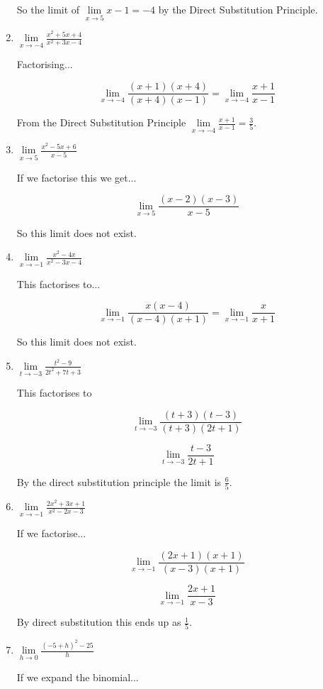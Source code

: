\documentclass{article}
\begin{document}
\begin{enumerate}
		So the limit of $\lim \limits _{x \to 5} x - 1 = -4$ by the Direct Substitution Principle.

		\item $\lim \limits _{x \to -4} \frac{x^2 + 5x + 4}{x^2 + 3x - 4}$

		Factorising...

		$$\lim \limits _{x \to -4} \frac{(x+1)(x+4)}{(x+4)(x-1)} = \lim \limits _{x \to -4} \frac{x+1}{x-1}$$

		From the Direct Substitution Principle $\lim \limits _{x \to -4} \frac{x+1}{x-1} = \frac{3}{5}$.

		\item $\lim \limits _{x \to 5} \frac{x^2 - 5x + 6}{x-5}$

		If we factorise this we get...

		$$\lim \limits _{x \to 5} \frac{(x-2)(x-3)}{x-5}$$

		So this limit does not exist.

		\item $\lim \limits _{x \to -1} \frac{x^2 - 4x}{x^2 - 3x - 4}$

		This factorises to...

		$$\lim \limits _{x \to -1} \frac{x(x - 4)}{(x-4)(x+1)} = \lim \limits _{x \to -1} \frac{x}{x+1}$$

		So this limit does not exist.

		\item $\lim \limits _{t \to -3} \frac{t^2 - 9}{2t^2 + 7t + 3}$

		This factorises to

		$$\lim \limits _{t \to -3} \frac{(t+3)(t-3)}{(t+3)(2t+1)}$$

		$$\lim \limits _{t \to -3} \frac{t-3}{2t+1}$$

		By the direct substitution principle the limit is $\frac{6}{5}$.

		\item $\lim \limits _{x \to -1} \frac{2x^2 + 3x + 1}{x^2 - 2x -3}$

		If we factorise...

		$$\lim \limits _{x \to -1} \frac{(2x+1)(x+1)}{(x-3)(x+1)}$$

		$$\lim \limits _{x \to -1} \frac{2x+1}{x-3}$$

		By direct substitution this ends up as $\frac{1}{5}$.

		\item $\lim \limits _{h \to 0} \frac{(-5 + h)^2 - 25}{h}$

		If we expand the binomial...


\end{enumerate}
\end{document}
